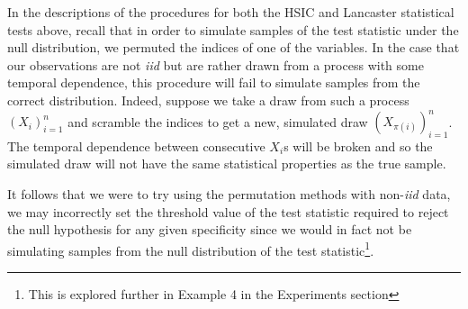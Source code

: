 \documentclass[12pt]{article}
\numberwithin{claim}{section}
\numberwithin{lemma}{section}
\numberwithin{theorem}{section}
\begin{document}

In the descriptions of the procedures for both the HSIC and Lancaster statistical tests above, recall that in order to simulate samples of the test statistic under the null distribution, we permuted the indices of one of the variables. In the case that our observations are not \emph{iid} but are rather drawn from a process with some temporal dependence, this procedure will fail to simulate samples from the correct distribution. Indeed, suppose we take a draw from such a process $(X_i)_{i=1}^n$ and scramble the indices to get a new, simulated draw $(X_{\pi(i)})_{i=1}^n$. The temporal dependence between consecutive $X_i$s will be broken and so the simulated draw will not have the same statistical properties as the true sample.

It follows that we were to try using the permutation methods with non-\emph{iid} data, we may incorrectly set the threshold value of the test statistic required to reject the null hypothesis for any given specificity since we would in fact not be simulating samples from the null distribution of the test statistic\footnote{This is explored further in Example 4 in the Experiments section}.
\end{document}
